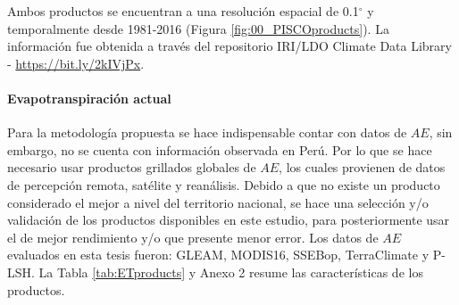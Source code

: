 \documentclass[12pt]{article}
\begin{document}
Ambos productos se encuentran a una resolución espacial de 0.1$^{\circ}$ y temporalmente desde 1981-2016 (Figura \ref{fig:00_PISCOproducts}). La información fue obtenida a través del repositorio IRI/LDO Climate Data Library - \url{https://bit.ly/2kIVjPx}.



\thispagestyle{empty}

\clearpage

\paragraph{Evapotranspiración actual}\mbox{}

Para la metodología propuesta se hace indispensable contar con datos de $AE$, sin embargo, no se cuenta con información observada en Perú. Por lo que se hace necesario usar productos grillados globales de $AE$, los cuales provienen de datos de percepción remota, satélite y reanálisis. Debido a que no existe un producto considerado el mejor a nivel del territorio nacional, se hace una selección y/o validación de los productos disponibles en este estudio, para posteriormente usar el de mejor rendimiento y/o que presente menor error. Los datos de $AE$ evaluados en esta tesis fueron: GLEAM, MODIS16, SSEBop, TerraClimate y P-LSH. La Tabla \ref{tab:ETproducts} y Anexo 2 resume las características de los productos.
\end{document}

